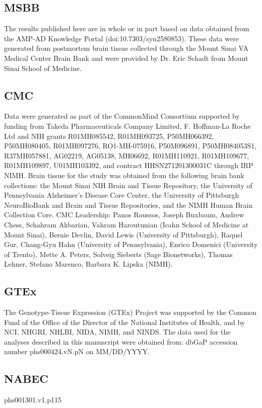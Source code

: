 {{\subsection{MSBB}
The results published here are in whole or in part based on data obtained from the AMP-AD Knowledge Portal (doi:10.7303/syn2580853). These data were generated from postmortem brain tissue collected through the Mount Sinai VA Medical Center Brain Bank and were provided by Dr. Eric Schadt from Mount Sinai School of Medicine. 

\subsection{CMC}

Data were generated as part of the CommonMind Consortium supported by funding from Takeda Pharmaceuticals Company Limited, F. Hoffman-La Roche Ltd and NIH grants R01MH085542, R01MH093725, P50MH066392, P50MH080405, R01MH097276, RO1-MH-075916, P50M096891, P50MH084053S1, R37MH057881, AG02219, AG05138, MH06692, R01MH110921, R01MH109677, R01MH109897, U01MH103392, and contract HHSN271201300031C through IRP NIMH. Brain tissue for the study was obtained from the following brain bank collections: the Mount Sinai NIH Brain and Tissue Repository, the University of Pennsylvania Alzheimer’s Disease Core Center, the University of Pittsburgh NeuroBioBank and Brain and Tissue Repositories, and the NIMH Human Brain Collection Core. CMC Leadership: Panos Roussos, Joseph Buxbaum, Andrew Chess, Schahram Akbarian, Vahram Haroutunian (Icahn School of Medicine at Mount Sinai), Bernie Devlin, David Lewis (University of Pittsburgh), Raquel Gur, Chang-Gyu Hahn (University of Pennsylvania), Enrico Domenici (University of Trento), Mette A. Peters, Solveig Sieberts (Sage Bionetworks), Thomas Lehner, Stefano Marenco, Barbara K. Lipska (NIMH). 

\subsection{GTEx}

The Genotype-Tissue Expression (GTEx) Project was supported by the Common Fund of the Office of the Director of the National Institutes of Health, and by NCI, NHGRI, NHLBI, NIDA, NIMH, and NINDS. The data used for the analyses described in this manuscript were obtained from:  dbGaP accession number phs000424.vN.pN on MM/DD/YYYY. 

\subsection{NABEC}
phs001301.v1.p115 

}}
